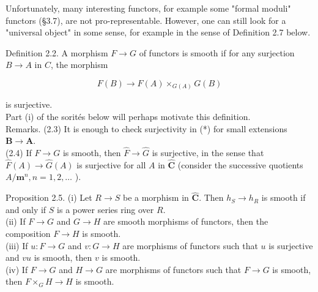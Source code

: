 \documentclass[10pt]{article}
\begin{document}
Unfortunately, many interesting functors, for example some "formal moduli" functors (§3.7), are not pro-representable. However, one can still look for a "universal object" in some sense, for example in the sense of Definition 2.7 below.

Definition 2.2. A morphism $F \rightarrow G$ of functors is smooth if for any surjection $B \rightarrow A$ in $C$, the morphism


\begin{equation*}
F(B) \rightarrow F(A) \times_{G(A)} G(B) \tag{*}
\end{equation*}


is surjective.\\
Part (i) of the sorités below will perhaps motivate this definition.\\
Remarks. (2.3) It is enough to check surjectivity in (*) for small extensions $\boldsymbol{B} \rightarrow \boldsymbol{A}$.\\
(2.4) If $F \rightarrow G$ is smooth, then $\hat{F} \rightarrow \hat{G}$ is surjective, in the sense that $\hat{F}(A) \rightarrow \hat{G}(A)$ is surjective for all $A$ in $\hat{\boldsymbol{C}}$ (consider the successive quotients $A / \boldsymbol{m}^{n}, n=1,2, \ldots$ ).

Proposition 2.5. (i) Let $R \rightarrow S$ be a morphism in $\hat{\boldsymbol{C}}$. Then $h_{S} \rightarrow h_{R}$ is smooth if and only if $S$ is a power series ring over $R$.\\
(ii) If $F \rightarrow G$ and $G \rightarrow H$ are smooth morphisms of functors, then the composition $F \rightarrow H$ is smooth.\\
(iii) If $u: F \rightarrow G$ and $v: G \rightarrow H$ are morphisms of functors such that $u$ is surjective and $v u$ is smooth, then $v$ is smooth.\\
(iv) If $F \rightarrow G$ and $H \rightarrow G$ are morphisms of functors such that $F \rightarrow G$ is smooth, then $F \times_{G} H \rightarrow H$ is smooth.
\end{document}
